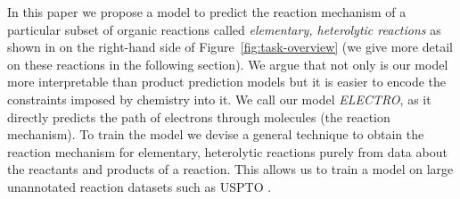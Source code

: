 In this paper we propose a model to predict the reaction mechanism of a particular subset of organic reactions called \emph{elementary, heterolytic reactions} as shown in on the right-hand side of Figure~\ref{fig:task-overview} (we give more detail on these reactions in the following section). 
We argue that not only is our model more interpretable than product prediction models but it is easier to encode the constraints imposed by chemistry into it. 
We call our model \emph{ELECTRO}, as it directly predicts the path of electrons through molecules (the reaction mechanism). 
To train the model we devise a general technique to obtain the reaction mechanism for elementary, heterolytic reactions purely from data about the reactants and products of a reaction. This allows us to train a model on large unannotated reaction datasets such as USPTO \cite{lowe2012extraction}. %



